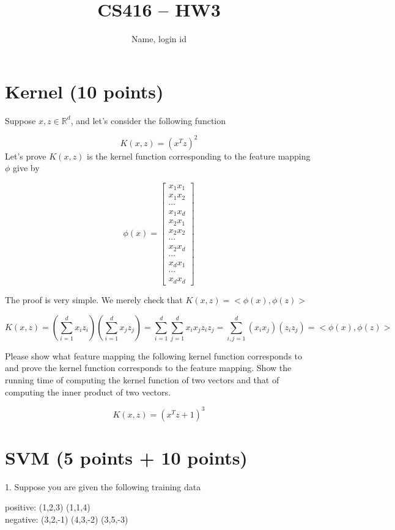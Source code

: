\documentclass{article}
\title{CS416 -- HW3}
\author{Name, login id}
\date{}
\begin{document}
\maketitle

\section{Kernel (10 points)}
Suppose $x,z\in \mathbb{R}^d$, and let's consider the following function

$$K(x,z)=(x^T z)^2
$$
Let's prove $K(x,z)$ is the kernel function corresponding to the feature mapping $\phi$ give by 

$$
\phi(x)=
\begin{bmatrix}
x_1x_1\\
x_1x_2\\
\cdots\\
x_1x_d\\
x_2x_1\\
x_2x_2\\
\cdots\\
x_2x_d\\
\cdots\\
x_dx_1\\
\cdots\\
x_dx_d
\end{bmatrix}
$$

The proof is very simple. We merely check that $K(x,z)=<\phi(x), \phi(z)>$

$$
K(x,z) = (\sum^d_{i=1}x_i z_i) (\sum^d_{i=1}x_j z_j)
=\sum^d_{i=1}\sum^d_{j=1}x_ix_jz_iz_j=\sum^d_{i,j=1} (x_ix_j)(z_iz_j)=<\phi(x), \phi(z)>
$$

Please show what feature mapping the  following kernel function corresponds to and prove the kernel function corresponds to the feature mapping. Show the running time of computing the kernel function of two vectors and that of computing the inner product of two vectors.  

$$
K(x,z)=(x^T z+1)^3
$$


\section{SVM (5 points + 10 points)}

1. Suppose you are given the following training data 

positive: (1,2,3) (1,1,4) \\
negative: (3,2,-1) (4,3,-2) (3,5,-3)
\end{document}
